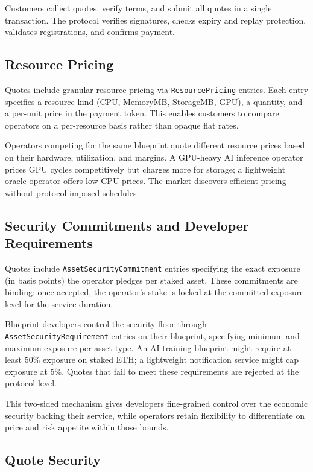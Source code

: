 \documentclass[11pt,a4paper]{article}
\begin{document}
Customers collect quotes, verify terms, and submit all quotes in a single transaction. The protocol verifies signatures, checks expiry and replay protection, validates registrations, and confirms payment.

\subsection{Resource Pricing}

Quotes include granular resource pricing via \texttt{ResourcePricing} entries. Each entry specifies a resource kind (CPU, MemoryMB, StorageMB, GPU), a quantity, and a per-unit price in the payment token. This enables customers to compare operators on a per-resource basis rather than opaque flat rates.

Operators competing for the same blueprint quote different resource prices based on their hardware, utilization, and margins. A GPU-heavy AI inference operator prices GPU cycles competitively but charges more for storage; a lightweight oracle operator offers low CPU prices. The market discovers efficient pricing without protocol-imposed schedules.

\subsection{Security Commitments and Developer Requirements}

Quotes include \texttt{AssetSecurityCommitment} entries specifying the exact exposure (in basis points) the operator pledges per staked asset. These commitments are binding: once accepted, the operator's stake is locked at the committed exposure level for the service duration.

Blueprint developers control the security floor through \texttt{AssetSecurityRequirement} entries on their blueprint, specifying minimum and maximum exposure per asset type. An AI training blueprint might require at least 50\% exposure on staked ETH; a lightweight notification service might cap exposure at 5\%. Quotes that fail to meet these requirements are rejected at the protocol level.

This two-sided mechanism gives developers fine-grained control over the economic security backing their service, while operators retain flexibility to differentiate on price and risk appetite within those bounds.

\subsection{Quote Security}
\end{document}
